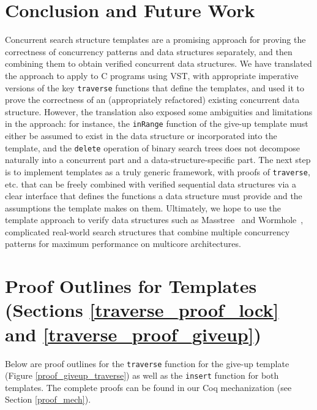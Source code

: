 \documentclass[a4paper,UKenglish,cleveref, autoref, thm-restate]{lipics-v2021}
\newcommand{\wm}[1]{\textbf{\textcolor{violet}{[William: #1]}}}
\begin{document}
\section{Conclusion and Future Work}
Concurrent search structure templates are a promising approach for proving the correctness of concurrency patterns and data structures separately, and then combining them to obtain verified concurrent data structures. We have translated the approach to apply to C programs using VST, with appropriate imperative versions of the key \lstinline{traverse} functions that define the templates, and used it to prove the correctness of an (appropriately refactored) existing concurrent data structure. However, the translation also exposed some ambiguities and limitations in the approach: for instance, the \lstinline{inRange} function of the give-up template must either be assumed to exist in the data structure or incorporated into the template, and the \lstinline{delete} operation of binary search trees does not decompose naturally into a concurrent part and a data-structure-specific part.  %
The next step is to implement templates as a truly generic framework, with proofs of \lstinline{traverse}, etc. that can be freely combined with verified sequential data structures via a clear interface that defines the functions a data structure must provide and the assumptions the template makes on them.
Ultimately, we hope to use the template approach to verify data structures such as Masstree~\cite{masstree} and Wormhole~\cite{wormhole}, complicated real-world search structures that combine multiple concurrency patterns for maximum performance on multicore architectures.



\newpage
\appendix

\section{Proof Outlines for Templates (Sections \ref{traverse_proof_lock} and \ref{traverse_proof_giveup})}
\label{sec:apd_proof}
Below are proof outlines for the \texttt{traverse} function for the give-up template (Figure \ref{proof_giveup_traverse}) as well as the \texttt{insert} function for both templates. The complete proofs can be found in our Coq mechanization (see Section \ref{proof_mech}).
\end{document}
